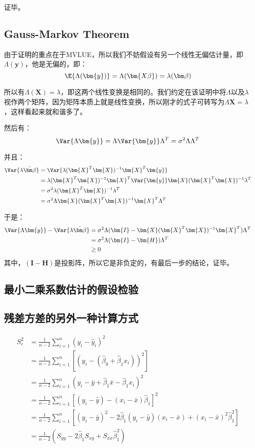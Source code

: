 \documentclass{MGLSA-cn-book-math}
\begin{document}
证毕。

\subsection{Gauss-Markov Theorem}
\label{proof:gauss-markov-thm}
由于证明的重点在于MVLUE，所以我们不妨假设有另一个线性无偏估计量，即$\Lambda(\bm{y})$，他是无偏的，即：
\[
	\E{\Lambda(\bm{y})}=\Lambda(\bm{X\beta})=\lambda(\bm\beta)
\]

所以有$\Lambda(\bm X)=\lambda$，即这两个线性变换是相同的。我们约定在该证明中将$\Lambda$以及$\lambda$视作两个矩阵，因为矩阵本质上就是线性变换，所以刚才的式子可转写为$\Lambda\bm{X}=\lambda$，这样看起来就和谐多了。

然后有：
\[
	\Var{\Lambda\bm{y}}=\Lambda\Var{\bm{y}}\Lambda^T=\sigma^2\Lambda\Lambda^T
\]

并且：
\begin{align*}
	\Var{\lambda\hat{\bm\beta}}&=\Var{\lambda(\bm{X}^T\bm{X})^{-1}\bm{X}^T\bm{y}} \\
	&=\lambda(\bm{X}^T\bm{X})^{-1}\bm{X}^T\Var{\bm{y}}\bm{X}(\bm{X}^T\bm{X})^{-1}\lambda^T \\
	&=\sigma^2\lambda(\bm{X}^T\bm{X})^{-1}\lambda^T \\
	&=\sigma^2\Lambda\bm{X}(\bm{X}^T\bm{X})^{-1}\bm{X}^T\Lambda^T
\end{align*}

于是：
\begin{align*}
	\Var{\Lambda\bm{y}}-\Var{\lambda\hat{\bm\beta}}&=\sigma^2\Lambda(\bm{I}-\bm{X}(\bm{X}^T\bm{X})^{-1}\bm{X}^T)\Lambda^T \\
	&=\sigma^2\Lambda(\bm{I}-\bm{H})\Lambda^T \\
	&\geq 0
\end{align*}
其中，$(\bm{I}-\bm{H})$是投影阵，所以它是非负定的，有最后一步的结论，证毕。
\subsection{最小二乘系数估计的假设检验}
\label{proof:LSE-beta-hypotest}


\subsection{残差方差的另外一种计算方式}
\label{proof16}
\begin{align*}
	S_e^2&=\frac{1}{n-2}\sum_{i=1}^n(y_i-\hat y_i)^2 \\
	&=\frac{1}{n-2}\sum_{i=1}^n[(y_i-(\hat\beta_0+\hat\beta_1x_i))^2] \\
	&=\frac{1}{n-2}\sum_{i=1}^n(y_i-\bar y+\hat\beta_1\bar x-\hat\beta_1x_i)^2 \\
	&=\frac{1}{n-2}\sum_{i=1}^n[(y_i-\hat y)-(x_i-\bar x)\hat\beta_1]^2 \\
	&=\frac{1}{n-2}\sum_{i=1}^n[(y_i-\bar y)^2-2\hat\beta_1(y_i-\hat y)(x_i-\bar x)+(x_i-\bar x)^2\hat\beta_1^2] \\
	&=\frac{1}{n-2}(S_{yy}-2\hat\beta_1S_{xy}+S_{xx}\hat\beta_1^2)
\end{align*}
\end{document}
